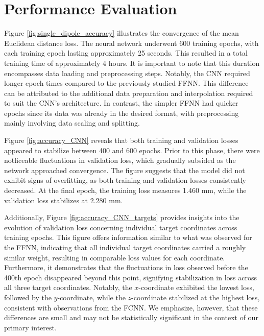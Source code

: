 \documentclass[a4paper, UKenglish, 11pt]{uiomaster}
\begin{document}

\section{Performance Evaluation}
Figure \ref{fig:single_dipole_accuracy} illustrates the convergence of the mean Euclidean distance loss. The neural network underwent 600 training epochs, with each training epoch lasting approximately 25 seconds. This resulted in a total training time of approximately 4 hours. It is important to note that this duration encompasses data loading and preprocessing steps. Notably, the CNN required longer epoch times compared to the previously studied FFNN. This difference can be attributed to the additional data preparation and interpolation required to suit the CNN's architecture. In contrast, the simpler FFNN had quicker epochs since its data was already in the desired format, with preprocessing mainly involving data scaling and splitting.

Figure \ref{fig:accuracy_CNN} reveals that both training and validation losses appeared to stabilize between 400 and 600 epochs. Prior to this phase, there were notficeable fluctuations in validation loss, which gradually subsided as the network approached convergence. The figure suggests that the model did not exhibit signs of overfitting, as both training and validation losses consistently decreased. At the final epoch, the training loss measures 1.460 mm, while the validation loss stabilizes at 2.280 mm.

Additionally, Figure \ref{fig:accuracy_CNN_targets} provides insights into the evolution of validation loss concerning individual target coordinates across training epochs. This figure offers information similar to what was observed for the FFNN, indicating that all individual target coordinates carried a roughly similar weight, resulting in comparable loss values for each coordinate. Furthermore, it demonstrates that the fluctuations in loss observed before the 400th epoch disappeared beyond this point, signifying stabilization in loss across all three target coordinates. Notably, the $x$-coordinate exhibited the lowest loss, followed by the $y$-coordinate, while the $z$-coordinate stabilized at the highest loss, consistent with observations from the FCNN. We emphasize, however, that these differences are small and may not be statistically significant in the context of our primary interest.
\end{document}
